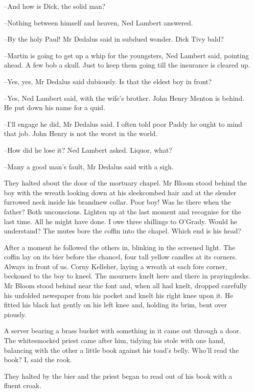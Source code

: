 --And how is Dick, the solid man?

--Nothing between himself and heaven,
Ned Lambert answered.

--By the holy Paul!
Mr Dedalus said in subdued wonder.
Dick Tivy bald?

--Martin is going to get up a whip for the youngsters,
Ned Lambert said, pointing ahead.
A few bob a skull.
Just to keep them going till the insurance is cleared up.

--Yes, yes,
Mr Dedalus said dubiously.
Is that the eldest boy in front?

--Yes,
Ned Lambert said,
with the wife's brother.
John Henry Menton is behind.
He put down his name for a quid.

--I'll engage he did,
Mr Dedalus said.
I often told poor Paddy he ought to mind that job.
John Henry is not the worst in the world.

--How did he lose it?
Ned Lambert asked.
Liquor, what?

--Many a good man's fault,
Mr Dedalus said with a sigh.

They halted about the door of the mortuary chapel.
Mr Bloom stood behind the boy with the wreath
looking down at his sleekcombed hair and
at the slender furrowed neck inside his brandnew collar.
Poor boy!
Was he there when the father?
Both unconscious.
Lighten up at the last moment and recognise for the last time.
All he might have done.
I owe three shillings to O'Grady.
Would he understand?
The mutes bore the coffin into the chapel.
Which end is his head?

After a moment he followed the others in,
blinking in the screened light.
The coffin lay on its bier before the chancel,
four tall yellow candles at its corners.
Always in front of us.
Corny Kelleher, laying a wreath at each fore corner,
beckoned to the boy to kneel.
The mourners knelt here and there in prayingdesks.
Mr Bloom stood behind near the font
and, when all had knelt,
dropped carefully his unfolded newspaper from his pocket
and knelt his right knee upon it.
He fitted his black hat gently on his left knee
and, holding its brim, bent over piously.

A server bearing a brass bucket with something in it came out through a door.
The whitesmocked priest came after him,
tidying his stole with one hand,
balancing with the other a little book against his toad's belly.
Who'll read the book?
I, said the rook.

They halted by the bier
and the priest began to read out of his book
with a fluent croak.

